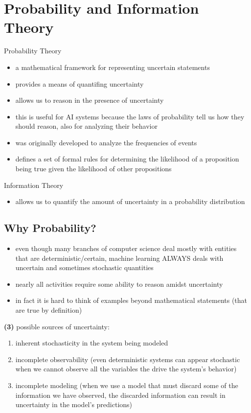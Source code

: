 \documentclass[11pt, twocolumn]{report}
\begin{document}
\setcounter{chapter}{2}
\chapter{Probability and Information Theory}
Probability Theory
\begin{itemize}
  \item a mathematical framework for representing uncertain statements
  \item provides a means of quantifing uncertainty
  \item allows us to reason in the presence of uncertainty
  \item this is useful for AI systems because the laws of probability tell us
    how they should reason, also for analyzing their behavior
  \item was originally developed to analyze the frequencies of events
  \item defines a set of formal rules for determining the likelihood of a
    proposition being true given the likelihood of other propositions
\end{itemize}

Information Theory
\begin{itemize}
  \item allows us to quantify the amount of uncertainty in a probability
    distribution
\end{itemize}

\section{Why Probability?}
\begin{itemize}
  \item even though many branches of computer science deal mostly with entities
    that are deterministic/certain, machine learning ALWAYS deals with
    uncertain and sometimes stochastic quantities
  \item nearly all activities require some ability to reason amidst uncertainty
  \item in fact it is hard to think of examples beyond mathematical statements
    (that are true by definition) 
\end{itemize}

\textbf{(3)} possible sources of uncertainty:
\begin{enumerate}
  \item inherent stochasticity in the system being modeled
  \item incomplete observability (even deterministic systems can appear
    stochastic when we cannot observe all the variables the drive the system's
    behavior)
  \item incomplete modeling (when we use a model that must discard some of the
    information we have observed, the discarded information can result in
    uncertainty in the model's predictions)
\end{enumerate}
\end{document}
